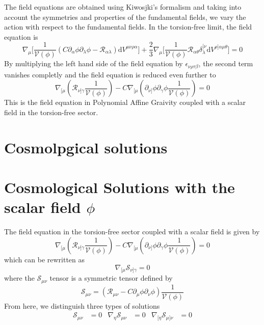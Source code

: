 \documentclass[10pt,a4paper]{article}
\begin{document}
The field equations are obtained using Kiwosjki's formalism and taking into account the symmetries and properties of the fundamental fields, we 
vary the action with respect to the fundamental fields. In the torsion-free limit, the field equation is
\begin{equation}
  \nabla_\mu \biggl[\frac{1}{\mathcal{V}(\phi)} \left(C \partial_\alpha \phi \partial_\lambda \phi - \mathcal{R}_{\alpha\lambda}\right)\mathrm{d}V^{\mu\nu\rho\alpha}\biggr] 
  + \frac{2}{3}\nabla_\mu \biggl[ \frac{1}{\mathcal{V}(\phi)}\mathcal{R}_{\alpha\theta} \delta^{[\nu}_{\lambda}\mathrm{d}V^{\rho]\alpha\mu\theta} \biggr] = 0
\end{equation}
By multiplying the left hand side of the field equation by $\epsilon_{\nu\rho\tau\beta}$, the second term vanishes completly and the field 
equation is reduced even further to
\begin{equation}
  \nabla_{[\mu}\left(\mathcal{R}_{\nu]\gamma}\frac{1}{\mathcal{V}(\phi)}\right) 
  - C \nabla_{[\mu}\left(\partial_{\nu]} \phi \partial_\gamma \phi \frac{1}{\mathcal{V}(\phi)}\right) = 0
\end{equation}
This is the field equation in Polynomial Affine Graivity coupled with a scalar field in the torsion-free sector.

\section{Cosmolpgical solutions}

\section{Cosmological Solutions with the scalar field $\phi$}

The field equation in the torsion-free sector coupled with a scalar field is given by
\begin{equation}
  \nabla_{[\mu}\left(\mathcal{R}_{\nu]\gamma}\frac{1}{\mathcal{V}(\phi)}\right) 
  - C \nabla_{[\mu}\left(\partial_{\nu]} \phi \partial_\gamma \phi \frac{1}{\mathcal{V}(\phi)}\right) = 0
\end{equation}
which can be rewritten as
\begin{equation}
  \nabla_{[\mu}\mathcal{S}_{\nu]\gamma} = 0
\end{equation}
where the $\mathcal{S}_{\mu\nu}$ tensor is a symmetric tensor defined by
\begin{equation}
  \mathcal{S}_{\mu\nu} = \left(\mathcal{R}_{\mu\nu} - C \partial_{\mu} \phi \partial_\nu \phi \right)\frac{1}{\mathcal{V}(\phi)}
\end{equation}
From here, we distinguish three types of solutions
\begin{align}
  \mathcal{S}_{\mu\nu} & = 0 & \nabla_{\eta} \mathcal{S}_{\mu\nu} & = 0 & \nabla_{[\eta} \mathcal{S}_{\mu]\nu} & = 0
\end{align}
\end{document}
